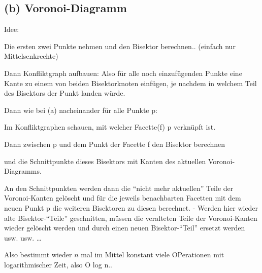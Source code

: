 \documentclass[a4paper]{article}
\begin{document}
\subsection*{(b) Voronoi-Diagramm}

Idee: 

Die ersten zwei Punkte nehmen und den Bisektor berechnen.. (einfach nur Mittelsenkrechte)

Dann Konfliktgraph aufbauen: Also für alle noch einzufügenden Punkte
eine Kante zu einem von beiden Bisektorknoten einfügen, je nachdem in welchem
Teil des Bisektors der Punkt landen würde.

Dann wie bei (a) nacheinander für alle Punkte p:

Im Konfliktgraphen schauen, mit welcher Facette(f) p verknüpft ist.

Dann zwischen p und dem Punkt der Facette f den Bisektor berechnen

und die Schnittpunkte dieses Bisektors mit Kanten des aktuellen Voronoi-Diagramms.

An den Schnittpunkten werden dann die "`nicht mehr aktuellen"' Teile der Voronoi-Kanten gelöscht
und für die jeweils benachbarten Facetten mit dem neuen Punkt p die weiteren Bisektoren zu diesen
berechnet. - Werden hier wieder alte Bisektor-"`Teile"' geschnitten, müssen die 
veralteten Teile der Voronoi-Kanten wieder gelöscht werden und durch einen neuen Bisektor-"`Teil"'
ersetzt werden usw. usw. \dots

Also bestimmt wieder $n$ mal im Mittel konstant viele OPerationen mit logarithmischer Zeit,
also O log n..
  
\end{document}
